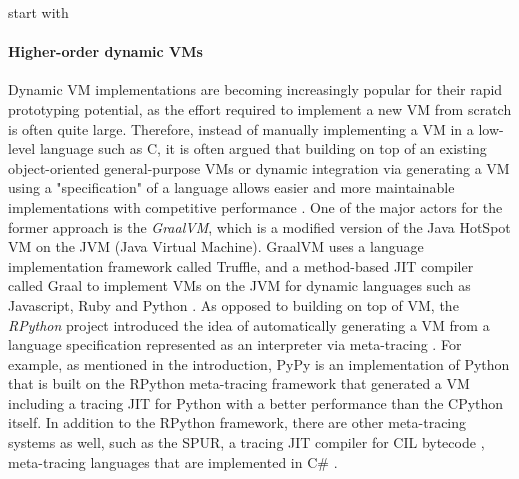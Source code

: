         \begin{paragraph-here}%
            start with \paragraph{Higher-order dynamic VMs}%

             Dynamic VM implementations are becoming increasingly popular for their
                rapid prototyping potential, as the effort required to implement a new
                VM from scratch is often quite large. Therefore, instead of manually
                implementing a VM in a low-level language such as C, it is often
                argued that building on top of an existing object-oriented
                general-purpose VMs or dynamic integration via generating a VM using a
                "specification" of a language allows easier and more maintainable
                implementations with competitive performance
                \cite{bolzHowNotWrite}. One of the major actors for the former approach
                is the \emph{GraalVM}, which is a modified version of the Java HotSpot
                VM on the JVM (Java Virtual Machine). GraalVM uses a language
                implementation framework called Truffle, and a method-based JIT
                compiler called Graal to implement VMs on the JVM for dynamic
                languages such as Javascript, Ruby and Python \cite{truffle-graal}. As
                opposed to building on top of VM, the \emph{RPython} project
                introduced the idea of automatically generating a VM from a language
                specification represented as an interpreter via meta-tracing
                \cite{rpython07}. For example, as mentioned in the introduction, PyPy
                is an implementation of Python that is built on the RPython
                meta-tracing framework that generated a VM including a tracing JIT for
                Python with a better performance than the CPython itself. In addition
                to the RPython framework, there are other meta-tracing systems as
                well, such as the SPUR, a tracing JIT compiler for CIL bytecode
                \cite{millerCommonLanguageInfrastructure2003}, meta-tracing languages that are implemented
                in C\# \cite{spurJIT}.
        \end{paragraph-here}

